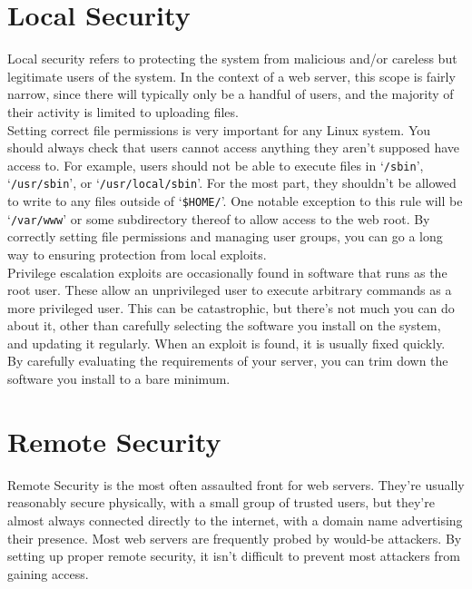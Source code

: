 \documentclass[10pt,letterpaper,titlepage]{article}
\begin{document}
\section*{Local Security}
Local security refers to protecting the system from malicious and/or careless but legitimate users of the system. In the context of a web server, this scope is fairly narrow, since there will typically only be a handful of users, and the majority of their activity is limited to uploading files.
\\

\noindent Setting correct file permissions is very important for any Linux system. You should always check that users cannot access anything they aren't supposed have access to. For example, users should not be able to execute files in `\texttt{/sbin}', `\texttt{/usr/sbin}', or `\texttt{/usr/local/sbin}'. For the most part, they shouldn't be allowed to write to any files outside of `\texttt{\$HOME/}'. One notable exception to this rule will be `\texttt{/var/www}' or some subdirectory thereof to allow access to the web root. By correctly setting file permissions and managing user groups, you can go a long way to ensuring protection from local exploits.
\\

\noindent Privilege escalation exploits are occasionally found in software that runs as the root user. These allow an unprivileged user to execute arbitrary commands as a more privileged user. This can be catastrophic, but there's not much you can do about it, other than carefully selecting the software you install on the system, and updating it regularly. When an exploit is found, it is usually fixed quickly. By carefully evaluating the requirements of your server, you can trim down the software you install to a bare minimum.

\section*{Remote Security}

\noindent Remote Security is the most often assaulted front for web servers. They're usually reasonably secure physically, with a small group of trusted users, but they're almost always connected directly to the internet, with a domain name advertising their presence. Most web servers are frequently probed by would-be attackers. By setting up proper remote security, it isn't difficult to prevent most attackers from gaining access.
\\
\end{document}
